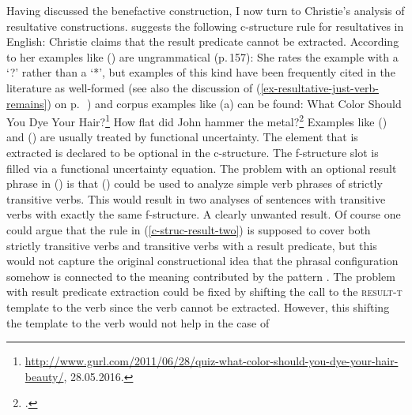 Having discussed the benefactive construction, I now turn to Christie's analysis of resultative constructions. \citet{Christie2010a}
suggests the following c-structure rule for resultatives in English:
\ea
\label{c-struc-result-two}
\z
Christie claims that the result predicate cannot be extracted. According to her examples like
() are ungrammatical (p.\,157):
\z
She rates the example with a `?' rather than a `*', but examples of this kind have been frequently
cited in the literature as well-formed (see also the discussion of
(\ref{ex-resultative-just-verb-remains}) on p.\,~\pageref{ex-resultative-just-verb-remains}) and
corpus examples like (a) can be found:
\eal
\ex  What Color Should You Dye Your Hair?\footnote{%
  \url{http://www.gurl.com/2011/06/28/quiz-what-color-should-you-dye-your-hair-beauty/}, 28.05.2016.
}
\ex How flat did John hammer the metal?\footnote{%
  .
}
\zl
Examples like () and () are usually treated by
functional uncertainty. The element that is extracted is declared to be optional in the
c-structure. The f-structure slot is filled via a functional uncertainty equation. The problem with
an optional result phrase in () is that () could be used to analyze simple
verb phrases of strictly transitive verbs. This would result in two analyses of sentences with
transitive verbs with exactly the same f-structure. A clearly unwanted result. Of course one could
argue that the rule in (\ref{c-struc-result-two}) is supposed to cover both strictly transitive
verbs and transitive verbs with a result predicate, but this would not capture the original
constructional idea that the phrasal configuration somehow is connected to the meaning contributed
by the pattern \citep{Goldberg95a,GJ2004a}.
The problem with result predicate extraction could be fixed by shifting the call to the \textsc{result-t}
template to the verb since the verb cannot be extracted. However, this shifting the template to the verb would not help in the case of
